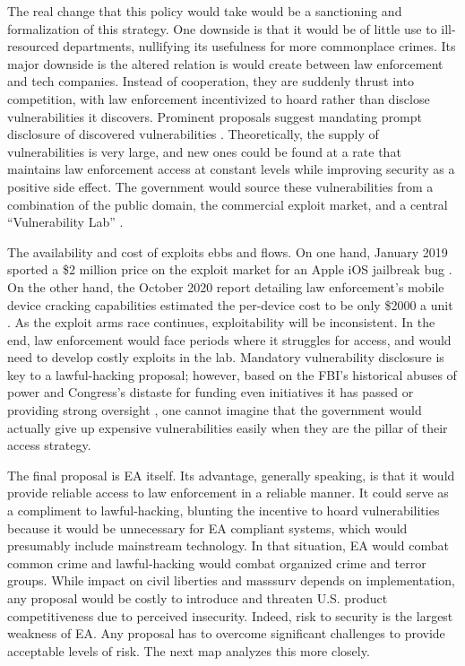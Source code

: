 The real change that this policy would take would be a sanctioning and formalization of this strategy. One downside is
that it would be of little use to ill-resourced departments, nullifying its usefulness for more commonplace crimes. Its
major downside is the altered relation is would create between law enforcement and tech companies. Instead of
cooperation, they are suddenly thrust into competition, with law enforcement incentivized to hoard rather than disclose
vulnerabilities it discovers. Prominent proposals suggest mandating prompt disclosure of discovered vulnerabilities
\cite{bellovin_lawful_2013} \cite{hennessey_lawful_2016}. Theoretically, the supply of vulnerabilities is very large,
and new ones could be found at a rate that maintains law enforcement access at constant levels while improving security
as a positive side effect. The government would source these vulnerabilities from a combination of the public domain,
the commercial exploit market, and a central ``Vulnerability Lab'' \cite{bellovin_lawful_2013}.

The availability and cost of exploits ebbs and flows. On one hand, January 2019 sported a \$2 million price on the
exploit market for an Apple iOS jailbreak bug \cite{goodin_zeroday_2019}. On the other hand, the October 2020 report
detailing law enforcement's mobile device cracking capabilities estimated the per-device cost to be only \$2000 a unit
\cite{koepke_2020}. As the exploit arms race continues, exploitability will be inconsistent. In the end, law enforcement
would face periods where it struggles for access, and would need to develop costly exploits in the lab. Mandatory
vulnerability disclosure is key to a \ac{lawful-hacking} proposal; however, based on the \ac{FBI}'s historical abuses of
power \cite{shamsi_2011} and Congress's distaste for funding even initiatives it has passed \cite{keller_internet_2019}
or providing strong oversight \cite{johnson_congressional_2004}, one cannot imagine that the government would actually
give up expensive vulnerabilities easily when they are the pillar of their access strategy.

The final proposal is \ac{EA} itself. Its advantage, generally speaking, is that it would provide reliable access to law
enforcement in a reliable manner. It could serve as a compliment to \ac{lawful-hacking}, blunting the incentive to hoard
vulnerabilities because it would be unnecessary for \ac{EA} compliant systems, which would presumably include mainstream
technology. In that situation, \ac{EA} would combat common crime and \ac{lawful-hacking} would combat organized crime
and terror groups. While impact on civil liberties and \ac{masssurv} depends on implementation, any proposal would be
costly to introduce and threaten U.S. product competitiveness due to perceived insecurity. Indeed, risk to security is
the largest weakness of \ac{EA}. Any proposal has to overcome significant challenges to provide acceptable levels of
risk. The next map analyzes this more closely.


